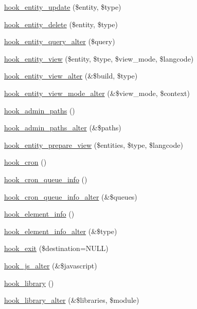\begin{DoxyCompactItemize}
\hyperlink{group__hooks_ga4b7c83c8b2e4f3719327ae794d0964ef}{hook\_\-entity\_\-update} (\$entity, \$type)
\item 
\hyperlink{group__hooks_gac329b7f9d18e7fbccb6057e6f4bc4cb9}{hook\_\-entity\_\-delete} (\$entity, \$type)
\item 
\hyperlink{group__hooks_ga22d97ef7297e17697cdaa8b32483f412}{hook\_\-entity\_\-query\_\-alter} (\$query)
\item 
\hyperlink{group__hooks_gae273ba271c2ef1192fe135afa9da5d49}{hook\_\-entity\_\-view} (\$entity, \$type, \$view\_\-mode, \$langcode)
\item 
\hyperlink{group__hooks_ga2c2be6c70815b426f0eb13b0b68edb40}{hook\_\-entity\_\-view\_\-alter} (\&\$build, \$type)
\item 
\hyperlink{group__hooks_gaca4b0e0aba85f92344ccf941684f2272}{hook\_\-entity\_\-view\_\-mode\_\-alter} (\&\$view\_\-mode, \$context)
\item 
\hyperlink{group__hooks_ga3fe6d93afc8bb04afbd9e3c326d1bdc1}{hook\_\-admin\_\-paths} ()
\item 
\hyperlink{group__hooks_ga027fc321194ec7bbc226ed6aff587e68}{hook\_\-admin\_\-paths\_\-alter} (\&\$paths)
\item 
\hyperlink{group__hooks_ga7e60ef817e60b20497bda315d2f30163}{hook\_\-entity\_\-prepare\_\-view} (\$entities, \$type, \$langcode)
\item 
\hyperlink{group__hooks_gaf07f1e3d98112fc2ba6920cf7ee6fb16}{hook\_\-cron} ()
\item 
\hyperlink{group__hooks_gae161ed78fd5e8775ffc9264346a64320}{hook\_\-cron\_\-queue\_\-info} ()
\item 
\hyperlink{group__hooks_gac9c5a8cc07a343c560e5ffac4a7de41f}{hook\_\-cron\_\-queue\_\-info\_\-alter} (\&\$queues)
\item 
\hyperlink{group__hooks_ga3c5182432eddc82f8b7845e66a365d51}{hook\_\-element\_\-info} ()
\item 
\hyperlink{group__hooks_gaf83b34170f31d93a7cfed56afa60007a}{hook\_\-element\_\-info\_\-alter} (\&\$type)
\item 
\hyperlink{group__hooks_gaab945bbc2e651510aee460dcc8691366}{hook\_\-exit} (\$destination=NULL)
\item 
\hyperlink{group__hooks_ga4e6dc7148292e5d6ce1754927a5ff06d}{hook\_\-js\_\-alter} (\&\$javascript)
\item 
\hyperlink{group__hooks_ga6bf3f83fa2e373836f5aa78fd143d1cd}{hook\_\-library} ()
\item 
\hyperlink{group__hooks_ga7256c50068666c9c02f43a08efcefae7}{hook\_\-library\_\-alter} (\&\$libraries, \$module)

\end{DoxyCompactItemize}
